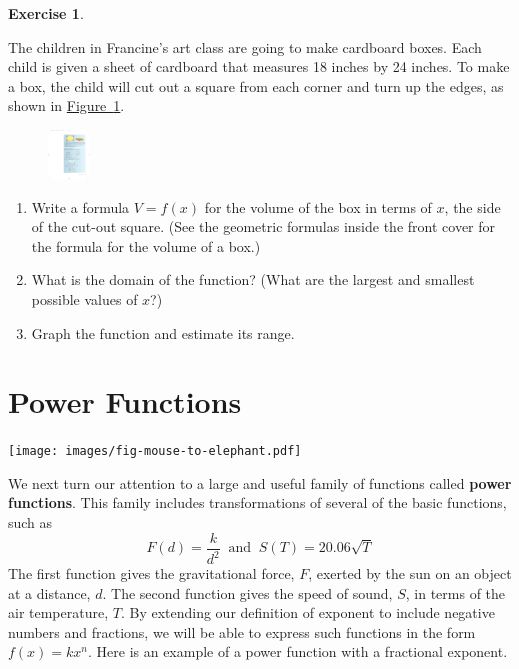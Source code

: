 \documentclass[10pt,]{book}
\newcommand{\terminology}[1]{\textbf{#1}}
\theoremstyle{plain}
\theoremstyle{definition}
\theoremstyle{definition}
\theoremstyle{definition}
\theoremstyle{definition}
\theoremstyle{definition}
\newtheorem{exercise}[theorem]{Exercise}
\numberwithin{equation}{section}
\begin{document}
\begin{exercise}\label{exercise-boxes}

    The children in Francine’s art class are going to make cardboard boxes. Each child is given a sheet of cardboard that measures 18 inches by 24 inches. To make a box, the child will cut out a square from each corner and turn up the edges, as shown in \hyperref[fig-boxes]{Figure~\ref{fig-boxes}}.
    \leavevmode%
\begin{figure}
\centering
\includegraphics[width=0.100\textwidth,]{images/fig-boxes.pdf}\caption{\label{fig-boxes}}
\end{figure}
\leavevmode%
\begin{enumerate}[label=*\alph**]
\item\hypertarget{li-387}{}Write a formula \(V = f (x)\) for the volume of the box in terms of \(x\), the side of the cut-out square. (See the geometric formulas inside the front cover for the formula for the volume of a box.)\item\hypertarget{li-388}{}What is the domain of the function? (What are the largest and smallest possible values of \(x\)?)\item\hypertarget{li-389}{}Graph the function and estimate its range.\end{enumerate}
\end{exercise}
\typeout{************************************************}
\typeout{************************************************}
\chapter[Power Functions]{Power Functions}\label{chap3}
\typeout{************************************************}
\typeout{************************************************}
\texttt{[image: images/fig-mouse-to-elephant.pdf]}%
\par

    We next turn our attention to a large and useful family of functions called \terminology{power functions}. This family includes transformations of several of the basic functions, such as
    \begin{equation*}
        F(d) = \frac{k}{d^2} ~\text{ and } ~ S(T ) = 20.06\sqrt{T}
    \end{equation*}
    The first function gives the gravitational force, \(F\), exerted by the sun on an object at a distance, \(d\). The second function gives the speed of sound, \(S\), in terms of the air temperature, \(T\). By extending our definition of exponent to include negative numbers and fractions, we will be able to express such functions in the form \(f (x) = kx^n\). Here is an example of a power function with a fractional exponent.
%
\par
\end{document}
